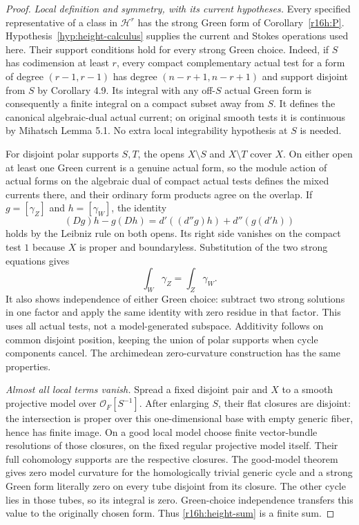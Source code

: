 \documentclass[11pt,a4paper]{article}
\theoremstyle{definition}
\theoremstyle{remark}
\numberwithin{equation}{section}
\begin{document}
\begin{proof}
\emph{Local definition and symmetry, with its current hypotheses.}
Every specified representative of a class in $\mathcal H^r$ has the
strong Green form of Corollary~\ref{r16h:P}. Hypothesis~\ref{hyp:height-calculus}
supplies the current and Stokes operations used here. Their support
conditions hold for every strong Green choice. Indeed, if $S$ has codimension at least
$r$, every compact complementary actual test for a form of degree
$(r-1,r-1)$ has degree $(n-r+1,n-r+1)$ and support disjoint from
$S$ by Corollary 4.9. Its integral with any off-$S$ actual Green
form is consequently a finite integral on a compact subset away
from $S$. It defines the canonical algebraic-dual actual current;
on original smooth tests it is continuous by Mihatsch Lemma 5.1.
No extra local integrability hypothesis at $S$ is needed.

For disjoint polar supports $S,T$, the opens $X\setminus S$ and
$X\setminus T$ cover $X$. On either open at least one Green current
is a genuine actual form, so the module action of actual forms on
the algebraic dual of compact actual tests defines the mixed
currents there, and their ordinary form products agree on the overlap.
If $g=[\gamma_Z]$ and $h=[\gamma_W]$, the identity
\[
 (Dg)h-g(Dh)=d'((d''g)h)+d''(g(d'h))
\]
holds by the Leibniz rule on both opens. Its right side vanishes
on the compact test $1$ because $X$ is proper and boundaryless.
Substitution of the two strong equations gives
\[
                    \int_W\gamma_Z=\int_Z\gamma_W.
\]
It also shows independence of either Green choice: subtract two
strong solutions in one factor and apply the same identity with
zero residue in that factor. This uses all actual tests, not a
model-generated subspace. Additivity follows on common disjoint
position, keeping the union of polar supports when cycle components
cancel. The archimedean zero-curvature construction has the same
properties.

\emph{Almost all local terms vanish.}
Spread a fixed disjoint pair and $X$ to a smooth projective model
over $\mathcal O_F[S^{-1}]$. After enlarging $S$, their flat closures
are disjoint: the intersection is proper over this one-dimensional
base with empty generic fiber, hence has finite image. On a good
local model choose finite vector-bundle resolutions of those
closures, on the fixed regular projective model itself. Their full
cohomology supports are the respective closures. The
good-model theorem gives zero model curvature for the homologically
trivial generic cycle and a strong Green form literally zero on
every tube disjoint from its closure. The other cycle lies in those
tubes, so its integral is zero. Green-choice independence transfers
this value to the originally chosen form. Thus
\eqref{r16h:height-sum} is a finite sum.


\end{proof}
\end{document}
